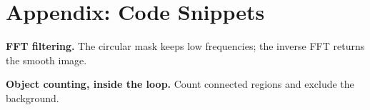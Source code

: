 \documentclass[10pt,a4paper]{article}
\begin{document}
\section*{Appendix: Code Snippets}
\small
\textbf{FFT filtering.} The circular mask keeps low frequencies; the inverse FFT returns the smooth image.

\textbf{Object counting, inside the loop.} Count connected regions and exclude the background.

\end{document}
